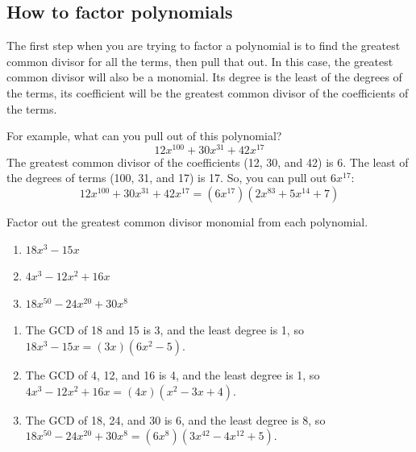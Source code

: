\subsection{How to factor polynomials}

The first step when you are trying to factor a polynomial is to find
the greatest common divisor for all the terms, then pull that out. In
this case, the greatest common divisor will also be a monomial. Its
degree is the least of the degrees of the terms, its coefficient will
be the greatest common divisor of the coefficients of the terms.

For example, what can you pull out of this polynomial?
\begin{equation*}
12x^{100} + 30x^{31} + 42x^{17}
\end{equation*}
The greatest common divisor of the coefficients (12, 30, and 42) is 6.  The least of the degrees of terms (100, 31, and 17) is 17.  So, you can pull out $6x^{17}$:
\begin{equation*}
12x^{100} + 30x^{31} + 42x^{17} = (6x^{17})(2x^{83} + 5x^{14} + 7)
\end{equation*}

\begin{Exercise}[title={Factoring out the GCD monomial}, label=gcdmonomial]
Factor out the greatest common divisor monomial from each polynomial.
\begin{enumerate}
\item $18x^3 - 15x$
\item $4x^3 - 12x^2 + 16x$
\item $18x^{50} - 24x^{20} + 30x^{8}$
\end{enumerate}
\end{Exercise}
\begin{Answer}[ref=gcdmonomial]
\begin{enumerate}
\item The GCD of 18 and 15 is 3, and the least degree is 1, so
  $18x^3 - 15x = (3x)(6x^2 - 5)$.
\item The GCD of 4, 12, and 16 is 4, and the least degree is 1, so
  $4x^3 - 12x^2 + 16x = (4x)(x^2 - 3x + 4)$.
\item The GCD of 18, 24, and 30 is 6, and the least degree is 8, so
  $18x^{50} - 24x^{20} + 30x^{8} = (6x^{8})(3x^{42} - 4x^{12} + 5)$.
\end{enumerate}
\end{Answer}


